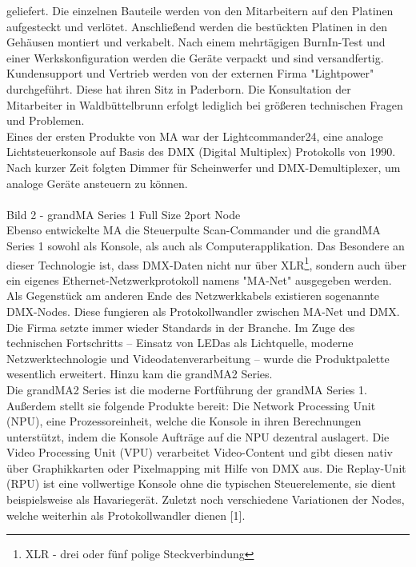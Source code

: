 \documentclass[11pt]{scrartcl}
\begin{document}
geliefert. Die einzelnen Bauteile werden von den
Mitarbeitern auf den Platinen aufgesteckt und verlötet.
Anschließend werden die bestückten Platinen in den Gehäusen montiert und verkabelt. Nach einem
mehrtägigen BurnIn-Test und einer Werkskonfiguration werden die Geräte verpackt und sind
versandfertig.\\
Kundensupport und Vertrieb werden von der externen Firma "Lightpower" durchgeführt. Diese hat
ihren Sitz in Paderborn. Die Konsultation der Mitarbeiter in Waldbüttelbrunn erfolgt lediglich bei
größeren technischen Fragen und Problemen.\\
Eines der ersten Produkte von MA war der Lightcommander24, eine analoge Lichtsteuerkonsole auf
Basis des DMX (Digital Multiplex) Protokolls von 1990. Nach kurzer Zeit folgten Dimmer für
Scheinwerfer und DMX-Demultiplexer, um analoge Geräte ansteuern zu können.\\
\\
Bild 2 - grandMA Series 1 Full Size 2port Node
\\
Ebenso entwickelte MA die Steuerpulte Scan-Commander und die grandMA Series 1 sowohl als
Konsole, als auch als Computerapplikation. Das Besondere an dieser Technologie ist, dass DMX-Daten
nicht nur über XLR\footnote{XLR - drei oder fünf polige Steckverbindung}, sondern auch über ein eigenes Ethernet-Netzwerkprotokoll namens "MA-Net"
ausgegeben werden. Als Gegenstück am anderen Ende des Netzwerkkabels existieren sogenannte
DMX-Nodes. Diese fungieren als Protokollwandler zwischen MA-Net und DMX.\\
Die Firma setzte immer wieder Standards in der Branche. Im Zuge des technischen Fortschritts –
Einsatz von LEDas als Lichtquelle, moderne Netzwerktechnologie und Videodatenverarbeitung –
wurde die Produktpalette wesentlich erweitert. Hinzu kam die grandMA2 Series.\\
Die grandMA2 Series ist die moderne Fortführung der grandMA Series 1. Außerdem stellt sie
folgende Produkte bereit: Die Network Processing Unit (NPU), eine Prozessoreinheit, welche die
Konsole in ihren Berechnungen unterstützt, indem die Konsole Aufträge auf die NPU dezentral
auslagert. Die Video Processing Unit (VPU) verarbeitet Video-Content und gibt diesen nativ über
Graphikkarten oder Pixelmapping mit Hilfe von DMX aus. Die Replay-Unit (RPU) ist eine vollwertige
Konsole ohne die typischen Steuerelemente, sie dient beispielsweise als Havariegerät. Zuletzt noch
verschiedene Variationen der Nodes, welche weiterhin als Protokollwandler dienen [1].\\
\end{document}
